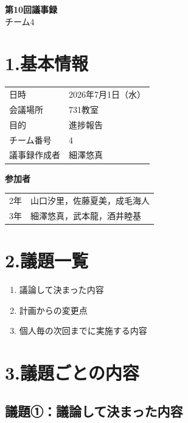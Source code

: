 \documentclass[a4paper,12pt]{ltjsarticle}
\begin{document}
\begin{center}
  {\Large \textbf{第10回議事録}}\\[8pt]
  {\large チーム4}
\end{center}

\vspace{4mm}

\section*{1.基本情報}
\begin{tabular}{ll}
  \toprule
  日時     & 2026年7月1日（水） \\
  会議場所 & 731教室 \\
  目的     & 進捗報告 \\
  チーム番号 & 4 \\
  議事録作成者 & 細澤悠真 \\
  \bottomrule
\end{tabular}

\vspace{4mm}
\noindent\textbf{参加者}

\begin{tabular}{ll}
  2年 & 山口汐里，佐藤夏美，成毛海人 \\
  3年 & 細澤悠真，武本龍，酒井睦基 \\
\end{tabular}

\section*{2.議題一覧}
\begin{enumerate}[label=議題\arabic*：]
  \item 議論して決まった内容
  \item 計画からの変更点
  \item 個人毎の次回までに実施する内容
\end{enumerate}

\section*{3.議題ごとの内容}

\subsection*{議題①：議論して決まった内容}
\end{document}

